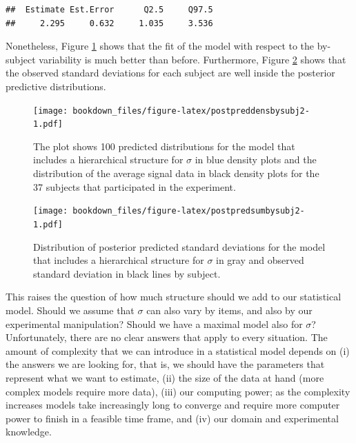 \documentclass[12pt,]{krantz}
\theoremstyle{definition}
\theoremstyle{definition}
\theoremstyle{definition}
\theoremstyle{remark}
\begin{document}
\begin{verbatim}
##  Estimate Est.Error      Q2.5     Q97.5 
##     2.295     0.632     1.035     3.536
\end{verbatim}

Nonetheless, Figure \ref{fig:postpreddensbysubj2} shows that the fit of
the model with respect to the by-subject variability is much better than
before. Furthermore, Figure \ref{fig:postpredsumbysubj2} shows that the
observed standard deviations for each subject are well inside the
posterior predictive distributions.






\begin{figure}
\centering
\texttt{[image: bookdown\_files/figure-latex/postpreddensbysubj2-1.pdf]}
\caption{\label{fig:postpreddensbysubj2}The plot shows 100 predicted distributions for
the model that includes a hierarchical structure for \(\sigma\) in blue
density plots and the distribution of the average signal data in black
density plots for the 37 subjects that participated in the experiment.}
\end{figure}






\begin{figure}
\centering
\texttt{[image: bookdown\_files/figure-latex/postpredsumbysubj2-1.pdf]}
\caption{\label{fig:postpredsumbysubj2}Distribution of posterior predicted standard
deviations for the model that includes a hierarchical structure for
\(\sigma\) in gray and observed standard deviation in black lines by
subject.}
\end{figure}

This raises the question of how much structure should we add to our
statistical model. Should we assume that \(\sigma\) can also vary by
items, and also by our experimental manipulation? Should we have a
maximal model also for \(\sigma\)? Unfortunately, there are no clear
answers that apply to every situation. The amount of complexity that we
can introduce in a statistical model depends on (i) the answers we are
looking for, that is, we should have the parameters that represent what
we want to estimate, (ii) the size of the data at hand (more complex
models require more data), (iii) our computing power; as the complexity
increases models take increasingly long to converge and require more
computer power to finish in a feasible time frame, and (iv) our domain
and experimental knowledge.
\end{document}
